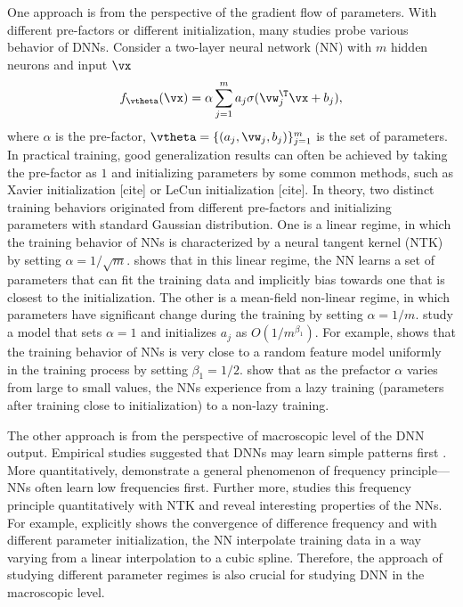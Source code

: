 \documentclass{article}
\begin{document}
One approach is from the perspective of the gradient flow of parameters. With different pre-factors or different initialization, many studies probe various behavior of DNNs. Consider a two-layer neural network (NN) with $m$ hidden neurons and input $\vx$
\begin{equation}
    f_{\vtheta}(\vx) = \alpha\sum_{j=1}^{m}a_j\sigma(\vw_j^\T\vx+b_j),     \label{eq: 2LNN}
\end{equation}
where $\alpha$ is the pre-factor, $\vtheta=\{(a_j,\vw_j,b_j)\}_{j=1}^{m}$ is the set of parameters. In practical training, good generalization results can often be achieved by taking the pre-factor as $1$ and initializing parameters by some common methods, such as Xavier initialization [cite] or LeCun initialization [cite]. In theory, two distinct training behaviors originated from different pre-factors and initializing parameters with standard Gaussian distribution. One is a linear regime, in which the training behavior of NNs is characterized by a neural tangent kernel (NTK) \cite{jacot_neural_2018,arora2019exact} by setting $\alpha=1/\sqrt{m}$. \cite{zhang_type_2019} shows that in this linear regime, the NN learns a set of parameters that can fit the training data and implicitly bias towards one that is closest to the initialization. The other is a mean-field non-linear regime, in which parameters have significant change during the training \cite{mei_mean_2018,rotskoff_parameters_2018,chizat_global_2018,sirignano_mean_2020} by setting $\alpha=1/m$. \cite{e2020comparative} study a model that sets  $\alpha=1$ and initializes $a_j$ as $O(1/m^{\beta_1})$. For example, \cite{e2020comparative} shows that the training behavior of NNs is very close to a random feature model uniformly in the training process \cite{e2020comparative} by setting $\beta_1=1/2$. \cite{chizat2018note} show that as the prefactor $\alpha$ varies from large to small values, the NNs experience from a lazy training (parameters after training close to initialization) to a non-lazy training.

The other approach is from the perspective of macroscopic level of the DNN output. Empirical studies suggested that DNNs may learn simple patterns first \cite{arpit2017closer,kalimeris_sgd_2019,valle2018deep}. More quantitatively,  \cite{xu_training_2019,xu_frequency_2019,rahaman_spectral_2019} demonstrate a general phenomenon of frequency principle---NNs often learn low frequencies first. Further more, \cite{zhang2019explicitizing,basri2019convergence,yang_fine-grained_2020,cao_towards_2020} studies this frequency principle quantitatively with NTK and reveal interesting properties of the NNs. For example, \cite{zhang2019explicitizing} explicitly shows the convergence of difference frequency and with different parameter initialization, the NN interpolate training data in a way varying from a linear interpolation to a cubic spline. Therefore, the approach of studying different parameter regimes is also crucial for studying DNN in the macroscopic level.
\end{document}

